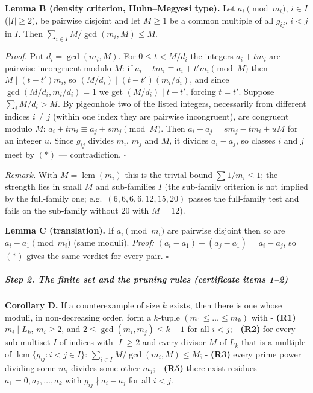 \documentclass[11pt,a4paper]{article}
\begin{document}
\textbf{Lemma B (density criterion, Huhn--Megyesi type).} Let
\(a_i\pmod{m_i}\), \(i\in I\) (\(|I|\ge2\)), be pairwise disjoint and
let \(M\ge1\) be a common multiple of all \(g_{ij}\), \(i<j\) in \(I\).
Then \(\sum_{i\in I} M/\gcd(m_i,M)\le M\).

\emph{Proof.} Put \(d_i=\gcd(m_i,M)\). For \(0\le t<M/d_i\) the integers
\(a_i+tm_i\) are pairwise incongruent modulo \(M\): if
\(a_i+tm_i\equiv a_i+t'm_i\pmod M\) then \(M\mid (t-t')m_i\), so
\((M/d_i)\mid (t-t')(m_i/d_i)\), and since \(\gcd(M/d_i,m_i/d_i)=1\) we
get \((M/d_i)\mid t-t'\), forcing \(t=t'\). Suppose \(\sum_i M/d_i>M\).
By pigeonhole two of the listed integers, necessarily from different
indices \(i\ne j\) (within one index they are pairwise incongruent), are
congruent modulo \(M\): \(a_i+tm_i\equiv a_j+sm_j\pmod M\). Then
\(a_i-a_j=sm_j-tm_i+uM\) for an integer \(u\). Since \(g_{ij}\) divides
\(m_i\), \(m_j\) and \(M\), it divides \(a_i-a_j\), so classes \(i\) and
\(j\) meet by \((*)\) --- contradiction. \(\square\)

\emph{Remark.} With \(M=\operatorname{lcm}(m_i)\) this is the trivial
bound \(\sum 1/m_i\le1\); the strength lies in small \(M\) and
sub-families \(I\) (the sub-family criterion is not implied by the
full-family one; e.g.~\((6,6,6,6,12,15,20)\) passes the full-family test
and fails on the sub-family without \(20\) with \(M=12\)).

\textbf{Lemma C (translation).} If \(a_i\pmod{m_i}\) are pairwise
disjoint then so are \(a_i-a_1\pmod{m_i}\) (same moduli). \emph{Proof:}
\((a_i-a_1)-(a_j-a_1)=a_i-a_j\), so \((*)\) gives the same verdict for
every pair. \(\square\)

\subparagraph{Step 2. The finite set and the pruning rules (certificate
items
1--2)}\label{step-2.-the-finite-set-and-the-pruning-rules-certificate-items-12}

\textbf{Corollary D.} If a counterexample of size \(k\) exists, then
there is one whose moduli, in non-decreasing order, form a \(k\)-tuple
\((m_1\le\dots\le m_k)\) with - \textbf{(R1)} \(m_i\mid L_k\),
\(m_i\ge2\), and \(2\le\gcd(m_i,m_j)\le k-1\) for all \(i<j\); -
\textbf{(R2)} for every sub-multiset \(I\) of indices with \(|I|\ge2\)
and every divisor \(M\) of \(L_k\) that is a multiple of
\(\operatorname{lcm}\{g_{ij}:i<j\in I\}\):
\(\sum_{i\in I} M/\gcd(m_i,M)\le M\); - \textbf{(R3)} every prime power
dividing some \(m_i\) divides some other \(m_j\); - \textbf{(R5)} there
exist residues \(a_1=0,a_2,\dots,a_k\) with \(g_{ij}\nmid a_i-a_j\) for
all \(i<j\).
\end{document}
